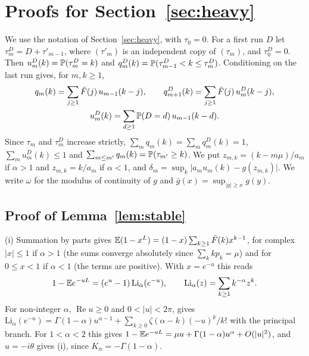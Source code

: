 \section{Proofs for Section~\texorpdfstring{\ref{sec:heavy}}{4}}\label{app:heavy}

We use the notation of Section~\ref{sec:heavy}, with $\tau_0=0$. For a first
run $D$ let $\tau^D_m=D+\tau'_{m-1}$, where $(\tau'_m)$ is an independent copy
of $(\tau_m)$, and $\tau^D_0=0$. Then $u^D_m(k)=\mathbb{P}(\tau^D_m=k)$ and
$q^D_m(k)=\mathbb{P}(\tau^D_{m-1}<k\le\tau^D_m)$. Conditioning on the last run
gives, for $m,k\ge1$,
\begin{equation}\label{eq:C-conv}
\begin{gathered}
q_m(k)=\sum_{j\ge1}\bar F(j)\,u_{m-1}(k-j),\qquad
q^D_{m+1}(k)=\sum_{j\ge1}\bar F(j)\,u^D_m(k-j),\\
u^D_m(k)=\sum_{d\ge1}\mathbb{P}(D=d)\,u_{m-1}(k-d).
\end{gathered}
\end{equation}
Since $\tau_m$ and $\tau^D_m$ increase strictly, $\sum_mq_m(k)=\sum_mq^D_m(k)=1$,
$\sum_mu^D_m(k)\le1$ and $\sum_{m\le m'}q_m(k)=\mathbb{P}(\tau_{m'}\ge k)$. We put
$z_{m,k}=(k-m\mu)/a_m$ if $\alpha>1$ and $z_{m,k}=k/a_m$ if $\alpha<1$, and
$\delta_m=\sup_k\lvert a_mu_m(k)-g(z_{m,k})\rvert$. We write $\omega$ for the
modulus of continuity of $g$ and $\bar g(x)=\sup_{\lvert y\rvert\ge x}g(y)$.

\subsection{Proof of Lemma~\texorpdfstring{\ref{lem:stable}}{4.3}}

(i) Summation by parts gives $\mathbb{E}(1-x^L)=(1-x)\sum_{k\ge1}\bar F(k)x^{k-1}$,
for complex $\lvert x\rvert\le1$ if $\alpha>1$ (the sums converge absolutely
since $\sum_kkp_k=\mu$) and for $0\le x<1$ if $\alpha<1$ (the terms are
positive). With $x=e^{-u}$ this reads
\begin{equation}\label{eq:C-polylog}
1-\mathbb{E} e^{-uL}=(e^u-1)\,\mathrm{Li}_\alpha(e^{-u}),\qquad
\mathrm{Li}_\alpha(z)=\sum_{k\ge1}k^{-\alpha}z^k .
\end{equation}
For non-integer $\alpha$, $\operatorname{Re}u\ge0$ and $0<\lvert u\rvert<2\pi$,
\cite[25.12.12]{dlmf} gives
$\mathrm{Li}_\alpha(e^{-u})=\Gamma(1-\alpha)u^{\alpha-1}+\sum_{k\ge0}\zeta(\alpha-k)(-u)^k/k!$
with the principal branch. For $1<\alpha<2$ this gives
$1-\mathbb{E} e^{-uL}=\mu u+\Gamma(1-\alpha)u^\alpha+O(\lvert u\rvert^2)$, and
$u=-i\theta$ gives (i), since $K_\alpha=-\Gamma(1-\alpha)$.

